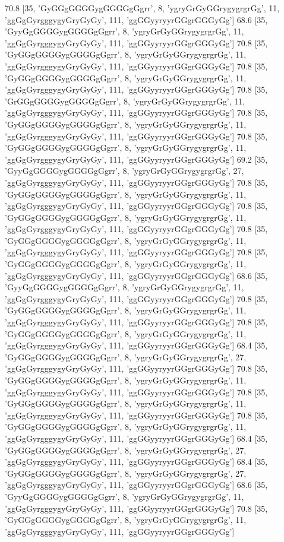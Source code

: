 70.8 [35, 'GyGGgGGGGygGGGGgGgrr', 8, 'ygryGrGyGGrygygrgrGg', 11, 'ggGgGyrgggygyGryGyGy', 111, 'ggGGyyryyrGGgrGGGyGg']
68.6 [35, 'GyyGgGGGGygGGGGgGgrr', 8, 'ygryGrGyGGrygygrgrGg', 11, 'ggGgGyrgggygyGryGyGy', 111, 'ggGGyyryyrGGgrGGGyGg']
70.8 [35, 'GyGGgGGGGygGGGGgGgrr', 8, 'ygryGrGyGGrygygrgrGg', 11, 'ggGgGyrgggygyGryGyGy', 111, 'ggGGyyryyrGGgrGGGyGg']
70.8 [35, 'GyGGgGGGGygGGGGgGgrr', 8, 'ygryGrGyGGrygygrgrGg', 11, 'ggGgGyrgggygyGryGyGy', 111, 'ggGGyyryyrGGgrGGGyGg']
70.8 [35, 'GrGGgGGGGygGGGGgGgrr', 8, 'ygryGrGyGGrygygrgrGg', 11, 'ggGgGyrgggygyGryGyGy', 111, 'ggGGyyryyrGGgrGGGyGg']
70.8 [35, 'GyGGgGGGGygGGGGgGgrr', 8, 'ygryGrGyGGrygygrgrGg', 11, 'ggGgGyrgggygyGryGyGy', 111, 'ggGGyyryyrGGgrGGGyGg']
70.8 [35, 'GyGGgGGGGygGGGGgGgrr', 8, 'ygryGrGyGGrygygrgrGg', 11, 'ggGgGyrgggygyGryGyGy', 111, 'ggGGyyryyrGGgrGGGyGg']
69.2 [35, 'GyyGgGGGGygGGGGgGgrr', 8, 'ygryGrGyGGrygygrgrGg', 27, 'ggGgGyrgggygyGryGyGy', 111, 'ggGGyyryyrGGgrGGGyGg']
70.8 [35, 'GyGGgGGGGygGGGGgGgrr', 8, 'ygryGrGyGGrygygrgrGg', 11, 'ggGgGyrgggygyGryGyGy', 111, 'ggGGyyryyrGGgrGGGyGg']
70.8 [35, 'GyGGgGGGGygGGGGgGgrr', 8, 'ygryGrGyGGrygygrgrGg', 11, 'ggGgGyrgggygyGryGyGy', 111, 'ggGGyyryyrGGgrGGGyGg']
70.8 [35, 'GyGGgGGGGygGGGGgGgrr', 8, 'ygryGrGyGGrygygrgrGg', 11, 'ggGgGyrgggygyGryGyGy', 111, 'ggGGyyryyrGGgrGGGyGg']
70.8 [35, 'GyGGgGGGGygGGGGgGgrr', 8, 'ygryGrGyGGrygygrgrGg', 11, 'ggGgGyrgggygyGryGyGy', 111, 'ggGGyyryyrGGgrGGGyGg']
68.6 [35, 'GyyGgGGGGygGGGGgGgrr', 8, 'ygryGrGyGGrygygrgrGg', 11, 'ggGgGyrgggygyGryGyGy', 111, 'ggGGyyryyrGGgrGGGyGg']
70.8 [35, 'GyGGgGGGGygGGGGgGgrr', 8, 'ygryGrGyGGrygygrgrGg', 11, 'ggGgGyrgggygyGryGyGy', 111, 'ggGGyyryyrGGgrGGGyGg']
70.8 [35, 'GyGGgGGGGygGGGGgGgrr', 8, 'ygryGrGyGGrygygrgrGg', 11, 'ggGgGyrgggygyGryGyGy', 111, 'ggGGyyryyrGGgrGGGyGg']
68.4 [35, 'GyGGgGGGGygGGGGgGgrr', 8, 'ygryGrGyGGrygygrgrGg', 27, 'ggGgGyrgggygyGryGyGy', 111, 'ggGGyyryyrGGgrGGGyGg']
70.8 [35, 'GyGGgGGGGygGGGGgGgrr', 8, 'ygryGrGyGGrygygrgrGg', 11, 'ggGgGyrgggygyGryGyGy', 111, 'ggGGyyryyrGGgrGGGyGg']
70.8 [35, 'GyGGgGGGGygGGGGgGgrr', 8, 'ygryGrGyGGrygygrgrGg', 11, 'ggGgGyrgggygyGryGyGy', 111, 'ggGGyyryyrGGgrGGGyGg']
70.8 [35, 'GyGGgGGGGygGGGGgGgrr', 8, 'ygryGrGyGGrygygrgrGg', 11, 'ggGgGyrgggygyGryGyGy', 111, 'ggGGyyryyrGGgrGGGyGg']
68.4 [35, 'GyGGgGGGGygGGGGgGgrr', 8, 'ygryGrGyGGrygygrgrGg', 27, 'ggGgGyrgggygyGryGyGy', 111, 'ggGGyyryyrGGgrGGGyGg']
68.4 [35, 'GyGGgGGGGygGGGGgGgrr', 8, 'ygryGrGyGGrygygrgrGg', 27, 'ggGgGyrgggygyGryGyGy', 111, 'ggGGyyryyrGGgrGGGyGg']
68.6 [35, 'GyyGgGGGGygGGGGgGgrr', 8, 'ygryGrGyGGrygygrgrGg', 11, 'ggGgGyrgggygyGryGyGy', 111, 'ggGGyyryyrGGgrGGGyGg']
70.8 [35, 'GyGGgGGGGygGGGGgGgrr', 8, 'ygryGrGyGGrygygrgrGg', 11, 'ggGgGyrgggygyGryGyGy', 111, 'ggGGyyryyrGGgrGGGyGg']

